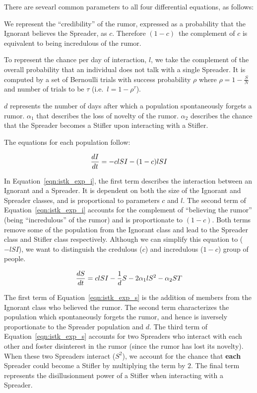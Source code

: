 There are sevearl common parameters to all four differential equations, as follows:

We represent the ``credibility'' of the rumor, expressed as a probability that the Ignorant believes the Spreader, as $ c $.
Therefore $ (1 - c) $\, the complement of $ c $ is equivalent to being incredulous of the rumor.

To represent the chance per day of interaction, $ l $, we take the complement of the overall probability that an individual does not talk with a single Spreader.
It is computed by a set of Bernoulli trials with success probability $ \rho $ where $ \rho = 1 - \frac{S}{N} $ and number of trials to be $ \tau $ (i.e.~$ l = 1 - \rho^\tau $).

$ d $ represents the number of days after which a population spontaneously forgets a rumor.
$\alpha_1$ that describes the loss of novelty of the rumor.
$ \alpha_2 $ describes the chance that the Spreader becomes a Stifler upon interacting with a Stifler.

The equations for each population follow:

\begin{equation}
\label{eqn:istk_exp_i}
\frac{dI}{dt} = - clSI - (1-c)lSI \\
\end{equation}

In Equation~\ref{eqn:istk_exp_i}, the first term describes the interaction between an Ignorant and a Spreader.
It is dependent on both the size of the Ignorant and Spreader classes, and is proportional to parameters $ c $ and $ l $.
 The second term of Equation~\ref{eqn:istk_exp_i} accounts for the complement of ``believing the rumor'' (being ``incredulous'' of the rumor) and is proportionate to $ (1 - c) $.
Both terms remove some of the population from the Ignorant class and lead to the Spreader class and Stifler class respectively. Although we can simplify this equation to ($-lSI$), we want to distinguish the credulous ($ c $) and incredulous ($ 1 - c $) group of people.

\begin{equation}
\label{eqn:istk_exp_s} \frac{dS}{dt} = clSI - \frac{1}{d} S - 2 \alpha_1l S^2 - \alpha_2 ST \\
\end{equation}

The first term of Equation~\ref{eqn:istk_exp_s} is the addition of members from the Ignorant class who believed the rumor.
The second term characterizes the population which spontaneously forgets the rumor, and hence is inversely proportionate to the Spreader population and $ d $.
The third term of Equation~\ref{eqn:istk_exp_s} accounts for two Spreaders who interact with each other and foster disinterest in the rumor (since the rumor has lost its novelty).
When these two Spreaders interact ($S^2$), we account for the chance that \textbf{each} Spreader could become a Stifler by multiplying the term by $ 2 $.
The final term represents the disillusionment power of a Stifler when interacting with a Spreader.

